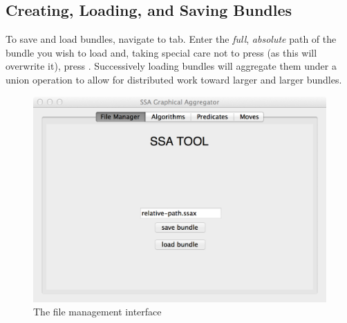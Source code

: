 \subsection{Creating, Loading, and Saving Bundles}
\label{sec:iface:saving}

To save and load bundles, navigate to  tab.
Enter the \emph{full}, \emph{absolute} path of the bundle you wish to load and,
  taking special care not to press 
  (as this will overwrite it),
  press .
Successively loading bundles will aggregate them under a union operation
  to allow for distributed work toward larger and larger bundles.

\begin{figure}
  \centering
  \includegraphics[width=\textwidth]{figs/3-2}
  \caption{The file management interface}
  \label{fig:iface:fmgr}
\end{figure}

